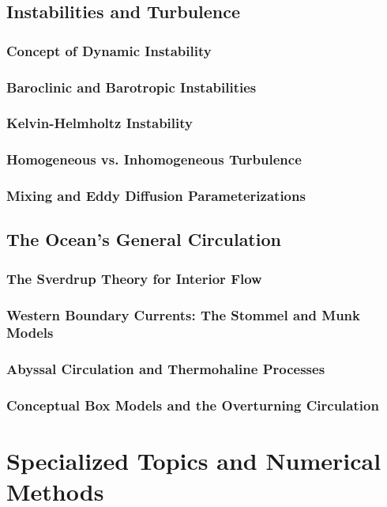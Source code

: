 \documentclass[12pt]{book}
\begin{document}
\chapter{Instabilities and Turbulence}
\section{Concept of Dynamic Instability}
\section{Baroclinic and Barotropic Instabilities}
\section{Kelvin-Helmholtz Instability}
\section{Homogeneous vs. Inhomogeneous Turbulence}
\section{Mixing and Eddy Diffusion Parameterizations}

\chapter{The Ocean's General Circulation}
\section{The Sverdrup Theory for Interior Flow}
\section{Western Boundary Currents: The Stommel and Munk Models}
\section{Abyssal Circulation and Thermohaline Processes}
\section{Conceptual Box Models and the Overturning Circulation}

\part{Specialized Topics and Numerical Methods}
\end{document}
